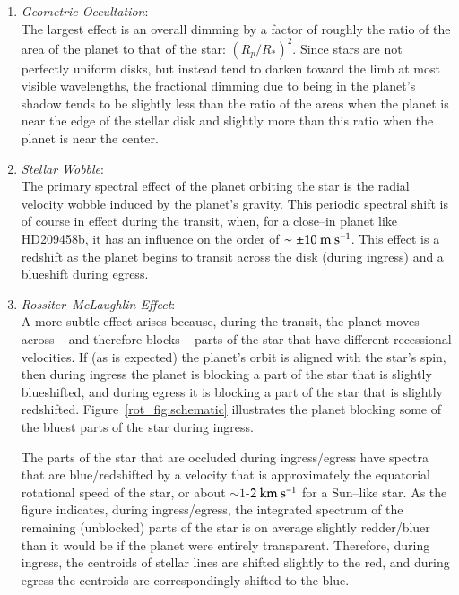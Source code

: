\begin{enumerate}
\label{list:transiteffects}
\item {\it Geometric Occultation}:\\ The largest effect is an overall
 dimming by a factor of roughly the ratio of the area of the planet to
 that of the star: $(R_p/R_*)^2$.  Since stars are not perfectly
 uniform disks, but instead tend to darken toward the limb at most
 visible wavelengths, the fractional dimming due to being in the
 planet's shadow tends to be slightly less than the ratio of the areas
 when the planet is near the edge of the stellar disk and slightly
 more than this ratio when the planet is near the center.
\item {\it Stellar Wobble}:\\ The primary spectral effect of the
 planet orbiting the star is the radial velocity wobble induced by the
 planet's gravity.  This periodic spectral shift is of course in
 effect during the transit, when, for a close--in planet like
 HD209458b, it has an influence on the order of $\sim \pm 10 {\rm
 ~m~s^{-1}}$.  This effect is a redshift as the planet begins to
 transit across the disk (during ingress) and a blueshift during
 egress.
\item {\it Rossiter--McLaughlin Effect}:\\ A more subtle effect arises
 because, during the transit, the planet moves across -- and therefore
 blocks -- parts of the star that have different recessional
 velocities.  If (as is expected) the planet's orbit is aligned with
 the star's spin, then during ingress the planet is blocking a part of
 the star that is slightly blueshifted, and during egress it is
 blocking a part of the star that is slightly redshifted.
 Figure~\ref{rot_fig:schematic} illustrates the planet blocking some
 of the bluest parts of the star during ingress.

The parts of the star that are occluded during ingress/egress have
spectra that are blue/redshifted by a velocity that is approximately
the equatorial rotational speed of the star, or about $\sim 1$-$2 {\rm
~km~s^{-1}}$ for a Sun--like star.  As the figure indicates, during
ingress/egress, the integrated spectrum of the remaining (unblocked)
parts of the star is on average slightly redder/bluer than it would be
if the planet were entirely transparent.  Therefore, during ingress,
the centroids of stellar lines are shifted slightly to the red, and
during egress the centroids are correspondingly shifted to the blue.


\end{enumerate}
